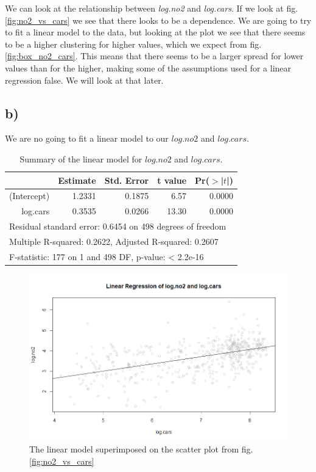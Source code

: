 \documentclass[a4paper,norsk, 10pt]{article}
\begin{document}
We can look at the relationship between \textit{log.no2} and \textit{log.cars}. If we look at fig. \ref{fig:no2_vs_cars} we see that there looks to be a dependence. We are going to try to fit a linear model to the data, but looking at the plot we see that there seems to be a higher clustering for higher values, which we expect from fig. \ref{fig:box_no2_cars}. This means that there seems to be a larger spread for lower values than for the higher, making some of the assumptions used for a linear regression false. We will look at that later.



\subsection*{b)}

We are no going to fit a linear model to our $log.no2$ and $log.cars$.


\begin{table}[!htbp]
\centering
\begin{tabular}{rrrrr}
  \hline
 & Estimate & Std. Error & t value & Pr($>$|$t$|) \\ 
  \hline
(Intercept) & 1.2331 & 0.1875 & 6.57 & 0.0000 \\ 
  log.cars & 0.3535 & 0.0266 & 13.30 & 0.0000 \\ 
   \hline
   \multicolumn{5}{l}{Residual standard error: 0.6454 on 498 degrees of freedom} \\
   \multicolumn{5}{l}{Multiple R-squared:  0.2622,	Adjusted R-squared:  0.2607} \\
   \multicolumn{5}{l}{F-statistic:   177 on 1 and 498 DF,  p-value: < 2.2e-16} \\ \hline
\end{tabular}
\caption{Summary of the linear model for $log.no2$ and $log.cars$.}\label{tab:no2_cars_fit}
\end{table}

\begin{figure}[!htbp]
\centering
\includegraphics[scale=0.5]{no2_cars_reg.png}
\caption{The linear model superimposed on the scatter plot from fig. \ref{fig:no2_vs_cars}}\label{fig:no2_vs_cars_fit}
\end{figure}
\end{document}
